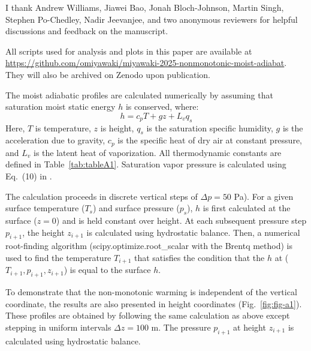 \documentclass[draft]{ametsocV6.1}
\begin{document}
\acknowledgments
I thank Andrew Williams, Jiawei Bao, Jonah Bloch-Johnson, Martin Singh, Stephen Po-Chedley, Nadir Jeevanjee, and two anonymous reviewers for helpful discussions and feedback on the manuscript.

% 
%
\datastatement
All scripts used for analysis and plots in this paper are available at \url{https://github.com/omiyawaki/miyawaki-2025-nonmonotonic-moist-adiabat}. They will also be archived on Zenodo upon publication.



\appendix[A] 
\label{app:calculation}
The moist adiabatic profiles are calculated numerically by assuming that saturation moist static energy $h$ is conserved, where:
\begin{equation}
h=c_p T+gz+L_v q_s \label{eq:mse}
\end{equation}
Here, $T$ is temperature, $z$ is height, $q_s$ is the saturation specific humidity, $g$ is the acceleration due to gravity, $c_p$ is the specific heat of dry air at constant pressure, and $L_v$ is the latent heat of vaporization. All thermodynamic constants are defined in Table~\ref{tab:tableA1}. Saturation vapor pressure is calculated using Eq.~(10) in \cite{bolton1980}.

The calculation proceeds in discrete vertical steps of $\Delta p = 50$ Pa). For a given surface temperature ($T_s$) and surface pressure ($p_s$), $h$ is first calculated at the surface ($z=0$) and is held constant over height. At each subsequent pressure step $p_{i+1}$, the height $z_{i+1}$ is calculated using hydrostatic balance. Then, a numerical root-finding algorithm (scipy.optimize.root\_scalar with the Brentq method) is used to find the temperature $T_{i+1}$ that satisfies the condition that the $h$ at ($T_{i+1}, p_{i+1}, z_{i+1}$) is equal to the surface $h$.

To demonstrate that the non-monotonic warming is independent of the vertical coordinate, the results are also presented in height coordinates (Fig.~\ref{fig:fig-a1}). These profiles are obtained by following the same calculation as above except stepping in uniform intervals $\Delta z=100$ m. The pressure $p_{i+1}$ at height $z_{i+1}$ is calculated using hydrostatic balance.
\end{document}
